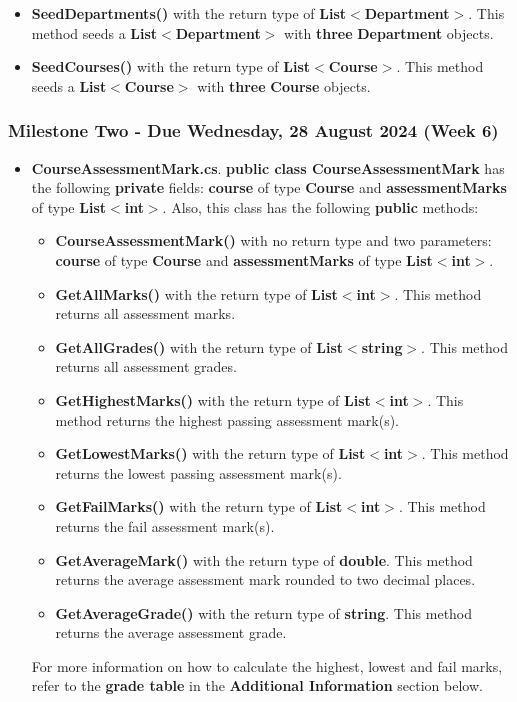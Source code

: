 \documentclass{article}
\begin{document}
\begin{itemize}
\begin{itemize}
        \item \textbf{SeedDepartments()} with the return type of \textbf{List$<$Department$>$}. This method seeds a \textbf{List$<$Department$>$} with \textbf{three} \textbf{Department} objects.
        \item \textbf{SeedCourses()} with the return type of \textbf{List$<$Course$>$}. This method seeds a \textbf{List$<$Course$>$} with \textbf{three} \textbf{Course} objects.
    \end{itemize}
\end{itemize}

\subsubsection*{Milestone Two - Due Wednesday, 28 August 2024 (Week 6)}

\begin{itemize}
    \item \textbf{CourseAssessmentMark.cs}. \textbf{public class CourseAssessmentMark} has the following \textbf{private} fields: \textbf{course} of type \textbf{Course} and \textbf{assessmentMarks} of type \textbf{List$<$int$>$}. Also, this class has the following \textbf{public} methods:
    \begin{itemize}
        \item \textbf{CourseAssessmentMark()} with no return type and two parameters: \textbf{course} of type \textbf{Course} and \textbf{assessmentMarks} of type \textbf{List$<$int$>$}. 
        \item \textbf{GetAllMarks()} with the return type of \textbf{List$<$int$>$}. This method returns all assessment marks.
        \item \textbf{GetAllGrades()} with the return type of \textbf{List$<$string$>$}. This method returns all assessment grades.
        \item \textbf{GetHighestMarks()} with the return type of \textbf{List$<$int$>$}. This method returns the highest passing assessment mark(s).
        \item \textbf{GetLowestMarks()} with the return type of \textbf{List$<$int$>$}. This method returns the lowest passing assessment mark(s). 
        \item \textbf{GetFailMarks()} with the return type of \textbf{List$<$int$>$}. This method returns the fail assessment mark(s).
        \item \textbf{GetAverageMark()} with the return type of \textbf{double}. This method returns the average assessment mark rounded to two decimal places.
        \item \textbf{GetAverageGrade()} with the return type of \textbf{string}. This method returns the average assessment grade.
    \end{itemize}
    For more information on how to calculate the highest, lowest and fail marks, refer to the \textbf{grade table} in the \textbf{Additional Information} section below.
\end{itemize}
\end{document}
